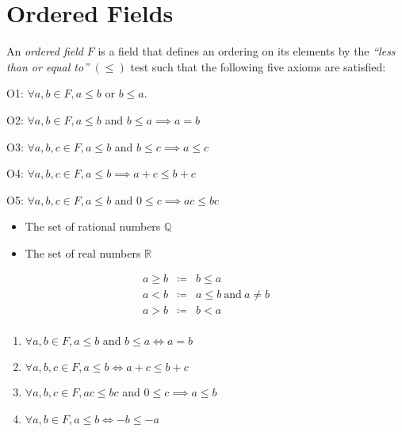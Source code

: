 \documentclass[letterpaper,12pt,fleqn]{article}
\begin{document}
\section*{Ordered Fields}

\begin{definition}
An \emph{ordered field} $F$ is a field that defines an ordering on its elements
by the \emph{``less than or equal to''} $(\le)$ test such that the following
five axioms are satisfied:
\begin{description}
\item{O1: } $\forall a,b\in F, a\le b$ or $b\le a$.
\item{O2: } $\forall a,b\in F, a\le b$ and $b\le a\implies a=b$
\item{O3: } $\forall a,b,c\in F, a\le b$ and $b\le c\implies a\le c$
\item{O4: } $\forall a,b,c\in F, a\le b\implies a+c\le b+c$
\item{O5: } $\forall a,b,c\in F, a\le b$ and $0\le c\implies ac\le bc$
\end{description}
\end{definition}

\begin{example}
\listbreak
\begin{itemize}
\item The set of rational numbers $\mathbb{Q}$
\item The set of real numbers $\mathbb{R}$
\end{itemize}
\end{example}

\begin{notation}
\listbreak
\begin{eqnarray*}
a\ge b &\coloneqq& b\le a \\
a<b &\coloneqq& a\le b\ \mbox{and}\ a\ne b \\
a>b &\coloneqq& b< a \\
\end{eqnarray*}
\end{notation}

\begin{properties}
\listbreak
\begin{enumerate}
\item{$\forall a,b\in F, a\le b$ and $b\le a\iff a=b$}
\item{$\forall a,b,c\in F, a\le b\iff a+c\le b+c$}
\item{$\forall a,b,c\in F, ac\le bc$ and $0\le c\implies a\le b$}
\item{$\forall a,b\in F, a\le b\iff -b\le -a$}
\end{enumerate}
\end{properties}
\end{document}
